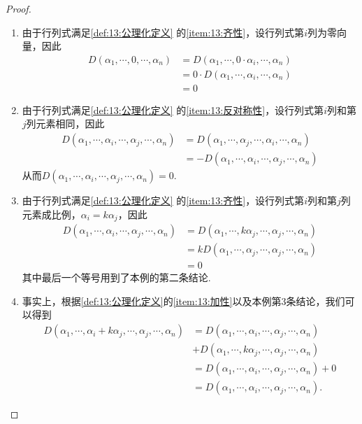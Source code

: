 \begin{proof}
    \begin{enumerate}
        \item 由于行列式满足\autoref{def:13:公理化定义} 的\ref*{item:13:齐性}，设行列式第$i$列为零向量，因此
        \begin{align*}
            D(\alpha_1,\cdots,0,\cdots,\alpha_n) &=D(\alpha_1,\cdots,0\cdot\alpha_i,\cdots,\alpha_n) \\
            &=0\cdot D(\alpha_1,\cdots,\alpha_i,\cdots,\alpha_n) \\
            &=0
        \end{align*}

        \item 由于行列式满足\autoref{def:13:公理化定义} 的\ref*{item:13:反对称性}，设行列式第$i$列和第$j$列元素相同，因此
        \begin{align*}
            D(\alpha_1,\cdots,\alpha_i,\cdots,\alpha_j,\cdots,\alpha_n) &=D(\alpha_1,\cdots,\alpha_j,\cdots,\alpha_i,\cdots,\alpha_n) \\
            &=-D(\alpha_1,\cdots,\alpha_i,\cdots,\alpha_j,\cdots,\alpha_n)
        \end{align*}
        从而$D(\alpha_1,\cdots,\alpha_i,\cdots,\alpha_j,\cdots,\alpha_n)=0$.

        \item 由于行列式满足\autoref{def:13:公理化定义} 的\ref*{item:13:齐性}，设行列式第$i$列和第$j$列元素成比例，$\alpha_i=k\alpha_j$，因此
        \begin{align*}
            D(\alpha_1,\cdots,\alpha_i,\cdots,\alpha_j,\cdots,\alpha_n) &=D(\alpha_1,\cdots,k\alpha_j,\cdots,\alpha_j,\cdots,\alpha_n) \\
            &=kD(\alpha_1,\cdots,\alpha_j,\cdots,\alpha_j,\cdots,\alpha_n) \\
            &=0
        \end{align*}
        其中最后一个等号用到了本例的第二条结论.

        \item 事实上，根据\autoref{def:13:公理化定义}的\ref*{item:13:加性}以及本例第3条结论，我们可以得到
        \begin{align*}
            D(\alpha_1,\cdots,\alpha_i+k\alpha_j,\cdots,\alpha_j,\cdots,\alpha_n) &=D(\alpha_1,\cdots,\alpha_i,\cdots,\alpha_j,\cdots,\alpha_n)\\&+D(\alpha_1,\cdots,k\alpha_j,\cdots,\alpha_j,\cdots,\alpha_n) \\
            &=D(\alpha_1,\cdots,\alpha_i,\cdots,\alpha_j,\cdots,\alpha_n)+0 \\
            &=D(\alpha_1,\cdots,\alpha_i,\cdots,\alpha_j,\cdots,\alpha_n).
        \end{align*}


\end{enumerate}
\end{proof}
